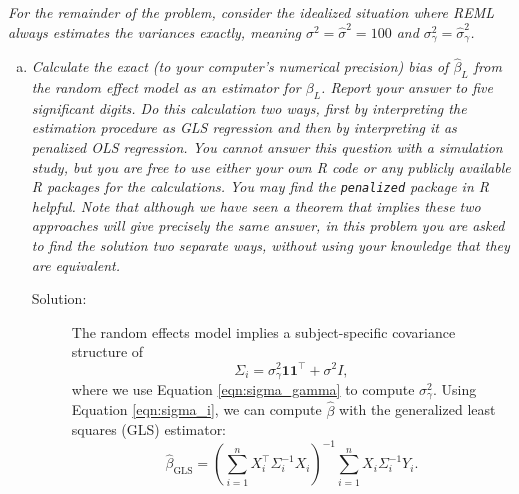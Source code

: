 \documentclass[11pt, letterpaper]{article}
\begin{document}
{\em For the remainder of the problem, consider the idealized situation where REML always estimates the variances
exactly, meaning $\sigma^2=\hat{\sigma}^2=100$ and $\sigma^2_\gamma=\hat{\sigma}^2_\gamma$.}
\begin{enumerate}[(a)]
\addtocounter{enumi}{6}
\item {\em Calculate the exact (to your computer's numerical precision) bias of $\hat{\beta}_L$ from the random effect model as an estimator for $\beta_L$.  Report your answer to five significant digits.  Do this calculation two ways, first by interpreting the estimation procedure as GLS regression and then by interpreting it as penalized OLS regression.   You cannot answer this question with a simulation study, but you are free to use either your own R code or any publicly available R packages for the calculations.  You may find the 
\texttt{penalized} package in R helpful.  Note that although we have seen a theorem that implies these two approaches will give precisely the same answer, in this
problem you are asked to find the solution two separate ways, without using your knowledge that they are equivalent.  }

\begin{description}
\item[Solution:] The random effects model implies a subject-specific covariance
  structure of
  \begin{equation}
    \Sigma_i = \sigma^2_\gamma\mathbf{1}\mathbf{1}^\intercal + \sigma^2I,
    \label{eqn:sigma_i}
  \end{equation}
  where we use Equation \ref{eqn:sigma_gamma} to compute
  $\sigma_\gamma^2$. Using Equation \ref{eqn:sigma_i}, we can compute
  $\hat{\beta}$ with the generalized least squares (GLS) estimator:
  \begin{equation}
    \hat{\beta}_{\text{GLS}} = \left(\sum_{i=1}^nX_i^\intercal \Sigma_i^{-1}X_i\right)^{-1}
    \sum_{i=1}^n X_i\Sigma_i^{-1}Y_i.
    \label{eqn:beta_hat_gls}
  \end{equation}


\end{description}
\end{enumerate}
\end{document}
